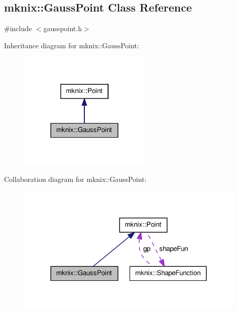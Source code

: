 \hypertarget{classmknix_1_1_gauss_point}{\subsection{mknix\-:\-:Gauss\-Point Class Reference}
\label{classmknix_1_1_gauss_point}
}


{\ttfamily \#include $<$gausspoint.\-h$>$}



Inheritance diagram for mknix\-:\-:Gauss\-Point\-:\nopagebreak
\begin{figure}[H]
\begin{center}
\leavevmode
\includegraphics[width=180pt]{d1/d02/classmknix_1_1_gauss_point__inherit__graph}
\end{center}
\end{figure}


Collaboration diagram for mknix\-:\-:Gauss\-Point\-:\nopagebreak
\begin{figure}[H]
\begin{center}
\leavevmode
\includegraphics[width=312pt]{d4/d8d/classmknix_1_1_gauss_point__coll__graph}
\end{center}
\end{figure}
